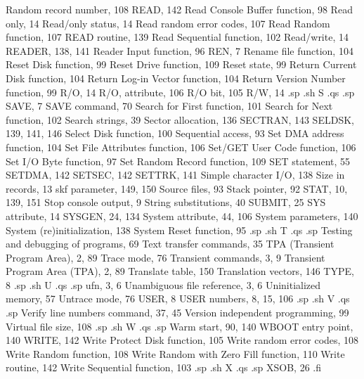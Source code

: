 Random record number, 108
READ, 142
Read Console Buffer
    function, 98
Read only, 14
Read/only status, 14
Read random error codes, 107
Read Random function, 107
READ routine, 139
Read Sequential function, 102
Read/write, 14
READER, 138, 141
Reader Input function, 96
REN, 7
Rename file function, 104
Reset Disk function, 99
Reset Drive function, 109
Reset state, 99
Return Current Disk
    function, 104
Return Log-in Vector
    function, 104
Return Version Number
    function, 99
R/O, 14
R/O, attribute, 106
R/O bit, 105
R/W, 14
.sp
.sh
S
.qs
.sp
SAVE, 7
SAVE command, 70
Search for First function, 101
Search for Next function, 102
Search strings, 39
Sector allocation, 136
SECTRAN, 143
SELDSK, 139, 141, 146
Select Disk function, 100
Sequential access, 93
Set DMA address function, 104
Set File Attributes
    function, 106
Set/GET User Code
    function, 106
Set I/O Byte function, 97
Set Random Record
    function, 109
SET statement, 55
SETDMA, 142
SETSEC, 142
SETTRK, 141
Simple character I/O, 138
Size in records, 13
skf parameter, 149, 150
Source files, 93
Stack pointer, 92
STAT, 10, 139, 151
Stop console output, 9
String substitutions, 40
SUBMIT, 25
SYS attribute, 14
SYSGEN, 24, 134
System attribute, 44, 106
System parameters, 140
System (re)initialization, 138
System Reset function, 95
.sp
.sh
T
.qs
.sp
Testing and debugging of
    programs, 69
Text transfer commands, 35
TPA (Transient Program Area),
    2, 89
Trace mode, 76
Transient commands, 3, 9
Transient Program Area
    (TPA), 2, 89
Translate table, 150
Translation vectors, 146
TYPE, 8
.sp
.sh
U
.qs
.sp
ufn, 3, 6
Unambiguous file reference,
    3, 6
Uninitialized memory, 57
Untrace mode, 76
USER, 8
USER numbers, 8, 15, 106
.sp
.sh
V
.qs
.sp
Verify line numbers command,
    37, 45
Version independent
    programming, 99
Virtual file size, 108
.sp
.sh
W
.qs
.sp
Warm start, 90, 140
WBOOT entry point, 140
WRITE, 142
Write Protect Disk
    function, 105
Write random error codes, 108
Write Random function, 108
Write Random with Zero Fill
    function, 110
Write routine, 142
Write Sequential function, 103
.sp
.sh
X
.qs
.sp
XSOB, 26
.fi


